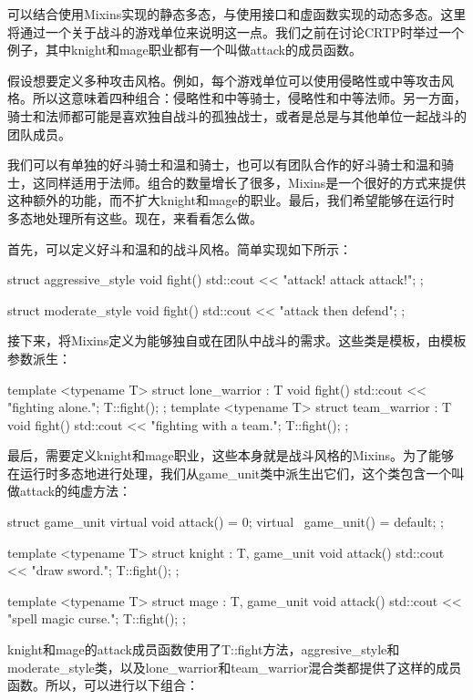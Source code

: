 可以结合使用Mixins实现的静态多态，与使用接口和虚函数实现的动态多态。这里将通过一个关于战斗的游戏单位来说明这一点。我们之前在讨论CRTP时举过一个例子，其中knight和mage职业都有一个叫做attack的成员函数。

假设想要定义多种攻击风格。例如，每个游戏单位可以使用侵略性或中等攻击风格。所以这意味着四种组合：侵略性和中等骑士，侵略性和中等法师。另一方面，骑士和法师都可能是喜欢独自战斗的孤独战士，或者是总是与其他单位一起战斗的团队成员。

我们可以有单独的好斗骑士和温和骑士，也可以有团队合作的好斗骑士和温和骑士，这同样适用于法师。组合的数量增长了很多，Mixins是一个很好的方式来提供这种额外的功能，而不扩大knight和mage的职业。最后，我们希望能够在运行时多态地处理所有这些。现在，来看看怎么做。

首先，可以定义好斗和温和的战斗风格。简单实现如下所示：

\begin{cpp}
struct aggressive_style
{
	void fight()
	{
		std::cout << "attack! attack attack!\n";
	}
};

struct moderate_style
{
	void fight()
	{
		std::cout << "attack then defend\n";
	}
};
\end{cpp}

接下来，将Mixins定义为能够独自或在团队中战斗的需求。这些类是模板，由模板参数派生：

\begin{cpp}
template <typename T>
struct lone_warrior : T
{
	void fight()
	{
		std::cout << "fighting alone.";
		T::fight();
	}
};
template <typename T>
struct team_warrior : T
{
	void fight()
	{
		std::cout << "fighting with a team.";
		T::fight();
	}
};
\end{cpp}

最后，需要定义knight和mage职业，这些本身就是战斗风格的Mixins。为了能够在运行时多态地进行处理，我们从game\_unit类中派生出它们，这个类包含一个叫做attack的纯虚方法：

\begin{cpp}
struct game_unit
{
	virtual void attack() = 0;
	virtual ~game_unit() = default;
};

template <typename T>
struct knight : T, game_unit
{
	void attack()
	{
		std::cout << "draw sword.";
		T::fight();
	}
};

template <typename T>
struct mage : T, game_unit
{
	void attack()
	{
		std::cout << "spell magic curse.";
		T::fight();
	}
};
\end{cpp}

knight和mage的attack成员函数使用了T::fight方法，aggresive\_style和moderate\_style类，以及lone\_warrior和team\_warrior混合类都提供了这样的成员函数。所以，可以进行以下组合：

